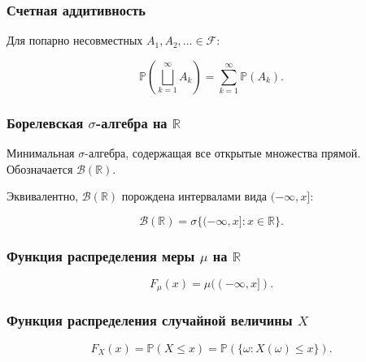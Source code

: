 \documentclass[
  11pt,
  a4paper,
]{article}
\begin{document}
\subsubsection{Счетная
аддитивность}\label{ux441ux447ux435ux442ux43dux430ux44f-ux430ux434ux434ux438ux442ux438ux432ux43dux43eux441ux442ux44c}

Для попарно несовместных \(A_1,A_2,\ldots\in\mathcal F\):

\[
\mathbb P\left(\bigsqcup_{k=1}^{\infty}A_k\right)
=
\sum_{k=1}^{\infty}\mathbb P(A_k).
\]

\subsubsection{\texorpdfstring{Борелевская \(\sigma\)-алгебра на
\(\mathbb R\)}{Борелевская \textbackslash sigma-алгебра на \textbackslash mathbb R}}\label{ux431ux43eux440ux435ux43bux435ux432ux441ux43aux430ux44f-sigma-ux430ux43bux433ux435ux431ux440ux430-ux43dux430-mathbb-r}

Минимальная \(\sigma\)-алгебра, содержащая все открытые множества
прямой. Обозначается \(\mathcal B(\mathbb R)\).

Эквивалентно, \(\mathcal B(\mathbb R)\) порождена интервалами вида
\((-\infty,x]\):

\[
\mathcal B(\mathbb R)=\sigma\{(-\infty,x]:x\in\mathbb R\}.
\]

\subsubsection{\texorpdfstring{Функция распределения меры \(\mu\) на
\(\mathbb R\)}{Функция распределения меры \textbackslash mu на \textbackslash mathbb R}}\label{ux444ux443ux43dux43aux446ux438ux44f-ux440ux430ux441ux43fux440ux435ux434ux435ux43bux435ux43dux438ux44f-ux43cux435ux440ux44b-mu-ux43dux430-mathbb-r}

\[
F_\mu(x)=\mu((-\infty,x]).
\]

\subsubsection{\texorpdfstring{Функция распределения случайной величины
\(X\)}{Функция распределения случайной величины X}}\label{ux444ux443ux43dux43aux446ux438ux44f-ux440ux430ux441ux43fux440ux435ux434ux435ux43bux435ux43dux438ux44f-ux441ux43bux443ux447ux430ux439ux43dux43eux439-ux432ux435ux43bux438ux447ux438ux43dux44b-x}

\[
F_X(x)=\mathbb P(X\le x)
=
\mathbb P(\{\omega:X(\omega)\le x\}).
\]
\end{document}
